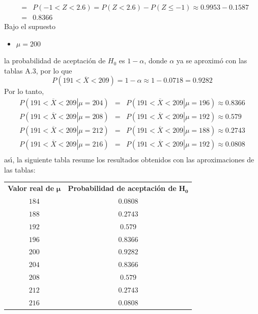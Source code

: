 \begin{solucion}
\begin{eqnarray*}
  & = & P(-1 < Z < 2.6) = P(Z < 2.6) - P(Z \leq -1) \approx 0.9953 - 0.1587 \\
  & = & 0.8366
 \end{eqnarray*}
 Bajo el supuesto
 \begin{itemize}
  \item $\mu = 200$
 \end{itemize}
 la probabilidad de aceptaci\'on de $H_0$ es $1-\alpha$, donde $\alpha$ ya se aproxim\'o con las tablas A.3, por lo que
 \begin{equation*}
  P\left( 191 < \overline{X} < 209 \right) = 1 - \alpha \approx 1 - 0.0718 = 0.9282
 \end{equation*}
 Por lo tanto, 
 \begin{eqnarray*}
  P\left( \left. 191 < \overline{X} < 209 \right| \mu = 204 \right) & = & P\left( \left. 191 < \overline{X} < 209 \right| \mu = 196 \right) \approx 0.8366 \\
  P\left( \left. 191 < \overline{X} < 209 \right| \mu = 208 \right) & = & P\left( \left. 191 < \overline{X} < 209 \right| \mu = 192 \right) \approx 0.579 \\
  P\left( \left. 191 < \overline{X} < 209 \right| \mu = 212 \right) & = & P\left( \left. 191 < \overline{X} < 209 \right| \mu = 188 \right) \approx 0.2743 \\
  P\left( \left. 191 < \overline{X} < 209 \right| \mu = 216 \right) & = & P\left( \left. 191 < \overline{X} < 209 \right| \mu = 192 \right) \approx 0.0808 \\
 \end{eqnarray*}
 as\'{\i}, la siguiente tabla resume los resultados obtenidos con las aproximaciones de las tablas:
 \begin{center}
  \begin{tabular}{cc}
   \textbf{Valor real de} $\mathbf{\mu}$ & \textbf{Probabilidad de aceptaci\'on de} $\mathbf{H_0}$ \\
   $184$ & $0.0808$ \\
   $188$ & $0.2743$ \\
   $192$ & $0.579$ \\
   $196$ & $0.8366$ \\
   $200$ & $0.9282$ \\
   $204$ & $0.8366$ \\
   $208$ & $0.579$ \\
   $212$ & $0.2743$ \\
   $216$ & $0.0808$
  \end{tabular}
 \end{center}

\end{solucion}
